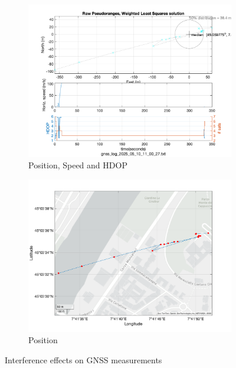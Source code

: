 \begin{figure}[h!]
\begin{subfigure}{0.23\textwidth}
                \label{fig:interference_cno}
            \end{subfigure}
            \hfill
            \begin{subfigure}{0.22\textwidth}            
                \vspace{0.40cm}
                \includegraphics[width=\textwidth]{images/tests/Monte_Cappuccini/Interferences/Samsung_A51_Monte_Cappuccini_interference_fig4.png}
                \caption{Position, Speed and HDOP}
                \label{fig:interference_pos}
            \end{subfigure}
            \hfill
            \begin{subfigure}{0.23\textwidth}
                \vspace{0.40cm}
                \includegraphics[width=\textwidth]{images/tests/Monte_Cappuccini/Interferences/Samsung_A51_Monte_Cappuccini_interference_fig6.png}
                \caption{Position}
                \label{fig:interference_pos}
            \end{subfigure}
            \vspace{0.35cm}
            \caption{Interference effects on GNSS measurements}
            \label{fig:interference_plots}
        \end{figure}
        